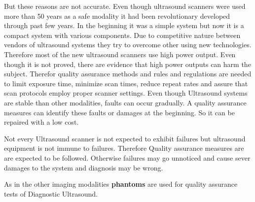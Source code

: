\documentclass[12pt]{article}
\def \topic{Diagnostic Ultrasound}
\begin{document}
But these reasons are not accurate. Even though ultrasound scanners were used more than 50 years as a safe modality it had been revolutionary developed through past few years. In the beginning it was a simple system but now it is a compact system with various components. Due to competitive nature between vendors of ultrasound systems they try to overcome other using new technologies. Therefore most of the new ultrasound scanners use high power output. Even though it is not proved, there are evidence that high power outputs can harm the subject. Therefor quality assurance methods and rules and regulations are needed to limit exposure time, minimize scan times, reduce repeat rates and assure that scan protocols employ proper scanner settings. Even though Ultrasound systems are stable than other modalities, faults can occur gradually. A quality assurance measures can identify these faults or damages at the beginning. So it can be repaired with a low cost. 

Not every Ultrasound scanner is not expected to exhibit failures but ultrasound equipment is not immune to failures. Therefore Quality assurance measures are are expected to be followed. Otherwise failures may go unnoticed and cause sever damages to the system and diagnosis may be wrong. 

As in the other imaging modalities \textbf{phantoms} are used for quality assurance tests of \topic . 
\end{document}

